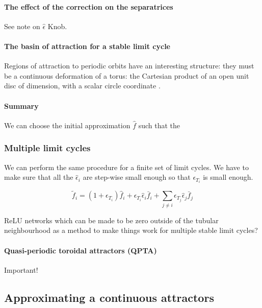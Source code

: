 \documentclass{article}
\theoremstyle{definition}
\theoremstyle{remark}
\newcounter{ct}
\begin{document}
\paragraph{The effect of the correction on the separatrices}
See note on  $\hat\epsilon$ Knob.


\paragraph{The basin of attraction for a stable limit cycle}
Regions of attraction to periodic orbits have an interesting structure: they must be a continuous deformation of a torus: the Cartesian product of an open unit disc of dimension, with a scalar circle coordinate \citep{wilson1967structure}.


\paragraph{Summary}
We can choose the initial approximation $\hat{f}$ such that the 


\subsubsection{Multiple limit cycles}
We can perform the same procedure for a finite set of limit cycles.
We have to make sure that all the $\hat{\epsilon}_i$ are step-wise small enough so that $\epsilon_{T_i}$ is small enough. 

\[ \tilde f_i = (1+ \epsilon_{T_i})\hat{f}_i + \epsilon_{T_i}\hat{\epsilon}_i\bar{f}_i + \sum_{j\neq i}\epsilon_{T_j}\hat{\epsilon}_j\bar{f}_j\]


 ReLU networks which can be made to be zero outside of the tubular neighbourhood as a method to make things work for multiple stable limit cycles?


\paragraph{Quasi-periodic toroidal attractors (QPTA)}%
Important!\citep{Park2023a}



\subsection{Approximating a continuous attractors}\label{sec:chaos}
\end{document}
